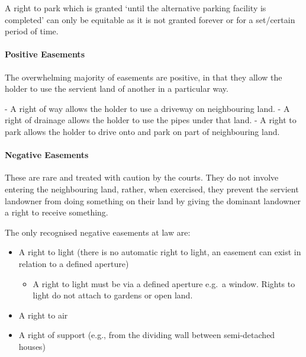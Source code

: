 \documentclass[
]{article}
\newenvironment{Shaded}{}{}
\newcommand{\NormalTok}[1]{#1}
\providecommand{\tightlist}{%
  \setlength{\itemsep}{0pt}\setlength{\parskip}{0pt}}
\begin{document}
\begin{Shaded}
\begin{Highlighting}[]
\NormalTok{A right to park which is granted ‘until the alternative parking facility is completed’ can only be equitable as it is not granted forever or for a set/certain period of time.}
\end{Highlighting}
\end{Shaded}

\hypertarget{positive-easements}{%
\paragraph{Positive Easements}\label{positive-easements}}

The overwhelming majority of easements are positive, in that they allow
the holder to use the servient land of another in a particular way.

\begin{Shaded}
\begin{Highlighting}[]
\NormalTok{{-} A right of way allows the holder to use a driveway on neighbouring land.}
\NormalTok{{-} A right of drainage allows the holder to use the pipes under that land.}
\NormalTok{{-} A right to park allows the holder to drive onto and park on part of neighbouring land.}
\end{Highlighting}
\end{Shaded}

\hypertarget{negative-easements}{%
\paragraph{Negative Easements}\label{negative-easements}}

These are rare and treated with caution by the courts. They do not
involve entering the neighbouring land, rather, when exercised, they
prevent the servient landowner from doing something on their land by
giving the dominant landowner a right to receive something.

The only recognised negative easements at law are:

\begin{itemize}
\tightlist
\item
  A right to light (there is no automatic right to light, an easement
  can exist in relation to a defined aperture)

  \begin{itemize}
  \tightlist
  \item
    A right to light must be via a defined aperture e.g.~a window.
    Rights to light do not attach to gardens or open land.
  \end{itemize}
\item
  A right to air
\item
  A right of support (e.g., from the dividing wall between semi-detached
  houses)
\end{itemize}
\end{document}
